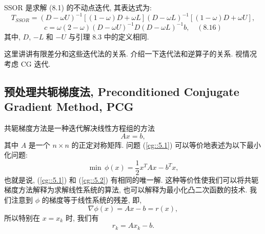 \documentclass[a4paper]{ctexart}
\newcommand{\hl}[1]
{\noindent {\bf {#1}}}
\begin{document}
{\hl{引理 8.15} SSOR 是求解 (8.1) 的不动点迭代, 其表达式为:
$$
T_{SSOR} = (D - \omega U)^{-1}[(1 - \omega)D 
+ \omega L](D - \omega L)^{-1}[(1 - \omega)D + \omega U], 
$$
$$
c = \omega(2 - \omega)(D - \omega U)^{-1}D(D - \omega L)^{-1}b, \quad (8.16) 
$$
其中, $D$, $-L$ 和 $-U$ 与引理 8.3 中的定义相同.

这里讲讲有限差分和这些迭代法的关系. 介绍一下迭代法和逆算子的关系. 视情况考虑 CG 迭代.

\subsection*{预处理共轭梯度法, Preconditioned Conjugate Gradient Method, PCG}
\setcounter{equation}{0}




共轭梯度方法是一种迭代解决线性方程组的方法
\begin{equation} 
  Ax = b, \label{cg::5.1} %
\end{equation}
其中 $A$ 是一个 $n \times n$ 的正定对称矩阵. 
问题 (\ref{cg::5.1}) 可以等价地表述为以下最小化问题:
\begin{equation} 
  \min \, \phi(x) = \frac{1}{2} x^T Ax - b^T x, \label{cg::5.2} 
\end{equation}
也就是说, (\ref{cg::5.1}) 和 (\ref{cg::5.2}) 有相同的唯一解. 
这种等价性使我们可以将共轭梯度方法解释为求解线性系统的算法, 
也可以解释为最小化凸二次函数的技术. 我们注意到 $\phi$ 的梯度等于线性系统的残差, 即, 
\begin{equation} 
  \nabla \phi(x) = A x - b = r(x), \label{cg::5.3} 
\end{equation}
所以特别在 $x = x_k$ 时, 我们有
\begin{equation} 
  r_k = A x_k - b. \label{cg::5.4} 
\end{equation}

}
\end{document}
